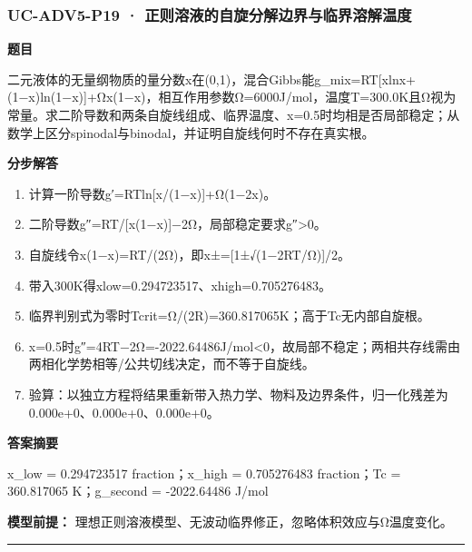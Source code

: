 \documentclass[UTF8,11pt,a4paper]{ctexart}
\begin{document}
\subsubsection*{UC-ADV5-P19 · 正则溶液的自旋分解边界与临界溶解温度}
\noindent\textbf{题目}\par
二元液体的无量纲物质的量分数x在(0,1)，混合Gibbs能g\_mix=RT[xlnx+(1−x)ln(1−x)]+Ωx(1−x)，相互作用参数Ω=6000J/mol，温度T=300.0K且Ω视为常量。求二阶导数和两条自旋线组成、临界温度、x=0.5时均相是否局部稳定；从数学上区分spinodal与binodal，并证明自旋线何时不存在真实根。\par
\medskip\noindent\textbf{分步解答}
\begin{enumerate}
\item 计算一阶导数g′=RTln[x/(1−x)]+Ω(1−2x)。
\item 二阶导数g″=RT/[x(1−x)]−2Ω，局部稳定要求g″>0。
\item 自旋线令x(1−x)=RT/(2Ω)，即x±=[1±√(1−2RT/Ω)]/2。
\item 带入300K得xlow=0.294723517、xhigh=0.705276483。
\item 临界判别式为零时Tcrit=Ω/(2R)=360.817065K；高于Tc无内部自旋根。
\item x=0.5时g″=4RT−2Ω=-2022.64486J/mol<0，故局部不稳定；两相共存线需由两相化学势相等/公共切线决定，而不等于自旋线。
\item 验算：以独立方程将结果重新带入热力学、物料及边界条件，归一化残差为 0.000e+0、0.000e+0、0.000e+0。
\end{enumerate}
\noindent\textbf{答案摘要}\par
x\_low = 0.294723517 fraction；x\_high = 0.705276483 fraction；Tc = 360.817065 K；g\_second = -2022.64486 J/mol\par
\noindent\textbf{模型前提：}
理想正则溶液模型、无波动临界修正，忽略体积效应与Ω温度变化。\par
\medskip\hrule\medskip
{}
\end{document}
